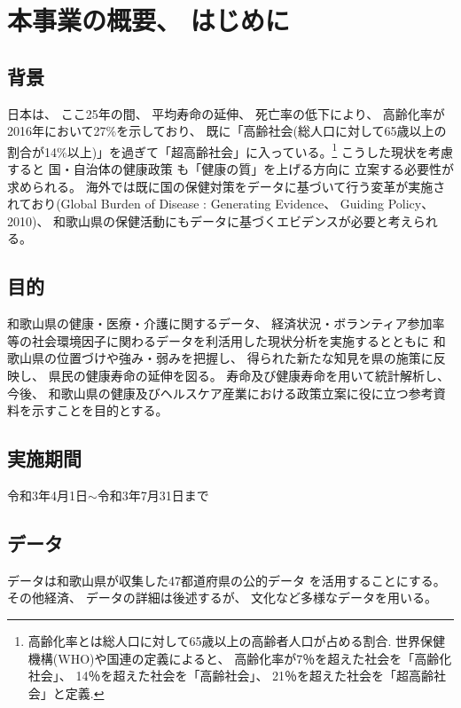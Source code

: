 
\chapter{本事業の概要、 はじめに}
\section{背景}
日本は、 ここ25年の間、 平均寿命の延伸、 死亡率の低下により、 高齢化率が2016年において27\%を示しており、 既に「高齢社会(総人口に対して65歳以上の割合が14\%以上)」を過ぎて「超高齢社会」に入っている。\footnote{
	高齢化率とは総人口に対して65歳以上の高齢者人口が占める割合. 世界保健機構(WHO)や国連の定義によると、 高齢化率が7％を超えた社会を「高齢化社会」、 14％を超えた社会を「高齢社会」、 21％を超えた社会を「超高齢社会」と定義.
}
こうした現状を考慮すると
国・自治体の健康政策
も「健康の質」を上げる方向に
立案する必要性が求められる。
海外では既に国の保健対策をデータに基づいて行う変革が実施されており(Global Burden of Disease :  Generating Evidence、 Guiding Policy、 2010)、
和歌山県の保健活動にもデータに基づくエビデンスが必要と考えられる。



\section{目的}
和歌山県の健康・医療・介護に関するデータ、 経済状況・ボランティア参加率等の社会環境因子に関わるデータを利活用した現状分析を実施するとともに
和歌山県の位置づけや強み・弱みを把握し、
得られた新たな知見を県の施策に反映し、 県民の健康寿命の延伸を図る。
寿命及び健康寿命を用いて統計解析し、
 今後、 和歌山県の健康及びヘルスケア産業における政策立案に役に立つ参考資料を示すことを目的とする。

\section{実施期間}
令和3年4月1日$\sim$令和3年7月31日まで


\section{データ}
データは和歌山県が収集した47都道府県の公的データ
を活用することにする。
その他経済、 データの詳細は後述するが、
文化など多様なデータを用いる。


